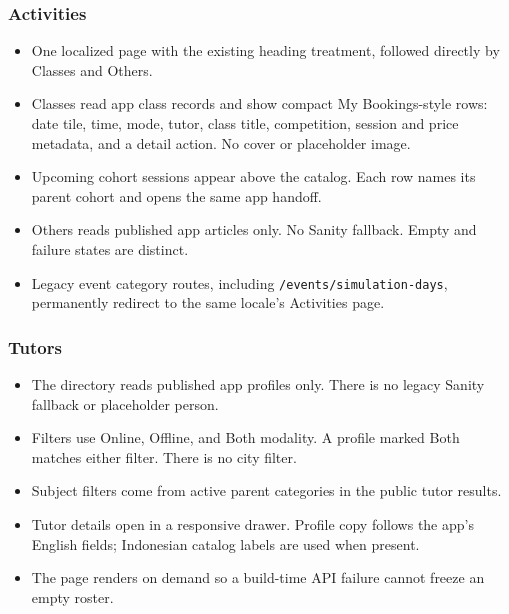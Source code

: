 \documentclass[11pt,a4paper]{article}
\newcommand{\code}[1]{\texttt{#1}}
\begin{document}
\subsubsection{Activities}
\begin{itemize}
	\item One localized page with the existing heading treatment, followed directly by Classes and Others.
	\item Classes read app class records and show compact My Bookings-style rows: date tile, time, mode, tutor, class title, competition, session and price metadata, and a detail action. No cover or placeholder image.
	\item Upcoming cohort sessions appear above the catalog. Each row names its parent cohort and opens the same app handoff.
	\item Others reads published app articles only. No Sanity fallback. Empty and failure states are distinct.
	\item Legacy event category routes, including \code{/events/simulation-days}, permanently redirect to the same locale's Activities page.
\end{itemize}

\subsubsection{Tutors}
\begin{itemize}
	\item The directory reads published app profiles only. There is no legacy Sanity fallback or placeholder person.
	\item Filters use Online, Offline, and Both modality. A profile marked Both matches either filter. There is no city filter.
	\item Subject filters come from active parent categories in the public tutor results.
	\item Tutor details open in a responsive drawer. Profile copy follows the app's English fields; Indonesian catalog labels are used when present.
	\item The page renders on demand so a build-time API failure cannot freeze an empty roster.
\end{itemize}
\end{document}
